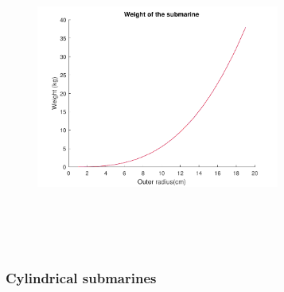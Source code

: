 \begin{figure}[htb]
\centering
\includegraphics[width=8cm, height=10cm, clip]{figures/Paul/SphereWeight.pdf}
\caption{}
\label{}
\end{figure}


\subsubsection{Cylindrical submarines}